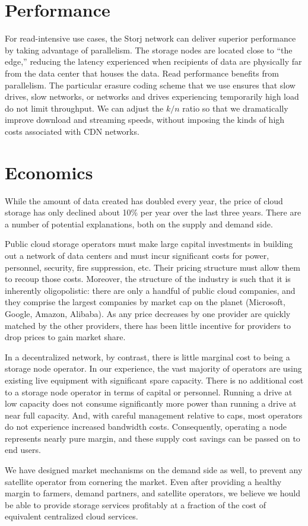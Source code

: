 \documentclass[8pt,fleqn,openany]{book}
\begin{document}
\section{Performance}

For read-intensive use cases, the Storj network can deliver superior
performance by taking advantage of parallelism. The storage nodes are located
close to ``the edge,'' reducing the latency experienced when recipients of
data are physically far from the data center that houses the data.
Read performance benefits from parallelism. The particular erasure coding
scheme that we use ensures that slow drives, slow networks, or networks and
drives experiencing temporarily high load do not limit throughput. We can
adjust the $k/n$ ratio so that we dramatically improve download and streaming
speeds, without imposing the kinds of high costs associated with CDN networks.

\section{Economics}

While the amount of data created has doubled every year, the price of cloud
storage has only declined about 10\% per year over the last three years.
There are a number of potential explanations, both on the supply and demand
side.

Public cloud storage operators must make large capital investments in
building out a network of data centers and must incur significant costs for
power, personnel, security, fire suppression, etc. Their pricing structure
must allow them to recoup those costs. Moreover, the structure of the
industry is such that it is inherently oligopolistic: there are only a
handful of public cloud companies, and they comprise the largest companies by
market cap on the planet (Microsoft, Google, Amazon, Alibaba).
As any price decreases by one provider are quickly matched by the other
providers, there has been little incentive for providers to drop prices to
gain market share.

In a decentralized network, by contrast, there is little
marginal cost to being a storage node operator. In our experience, the vast
majority of operators are using existing live equipment with significant spare
capacity. There is no additional cost to a storage node operator in terms of
capital or personnel. Running a drive at low capacity does not consume
significantly more power than running a drive at near full capacity. And, with
careful management relative to caps, most operators do not experience
increased bandwidth costs. Consequently, operating a node represents nearly
pure margin, and these supply cost savings can be passed on to end users.

We have designed market mechanisms on the demand side as well, to prevent any
satellite operator from cornering the market. Even after providing a healthy
margin to farmers, demand partners, and satellite operators, we believe we
hould be able to provide storage services profitably at a fraction of the cost
of equivalent centralized cloud services.

\newpage

\begingroup
\raggedright

\endgroup
\end{document}

